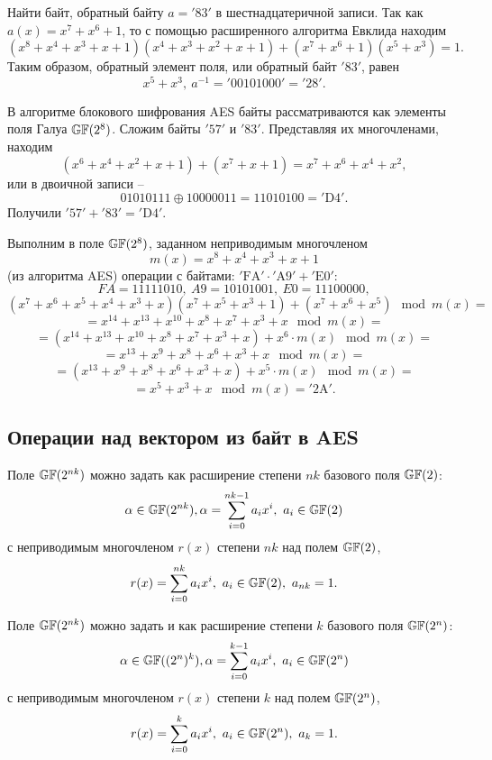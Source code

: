 \example
Найти байт, обратный байту $a = \mathrm{'83'}$ в шестнадцатеричной записи. Так как $a(x) = x^{7} + x^{6} + 1$, то с помощью расширенного алгоритма Евклида находим
    \[ (x^{8} + x^{4} + x^{3} + x + 1) (x^{4} + x^{3} + x^{2} + x + 1) + (x^{7} + x^{6} + 1) (x^{5} + x^{3}) = 1. \]
Таким образом, обратный элемент поля, или обратный байт $\mathrm{'83'}$, равен
    \[ x^{5} + x^{3}, ~ a^{-1} = \mathrm{'00101000'} = \mathrm{'28'}. \]
\exampleend

\example
В алгоритме блокового шифрования AES байты рассматриваются как элементы поля Галуа $\mathbb{GF}(2^8)$. Сложим байты $\mathrm{'57'}$ и $\mathrm{'83'}$. Представляя их многочленами, находим
    \[ (x^6 + x^4 + x^2 + x + 1) + (x^7 + x + 1) = x^7 + x^6 + x^4 + x^2, \]
или в двоичной записи --
    \[ 01010111 \oplus 10000011 = 11010100 = \mathrm{'D4'}. \]
Получили $\mathrm{'57'} + \mathrm{'83'} = \mathrm{'D4'}$.
\exampleend

\example
Выполним в поле $\mathbb{GF}(2^8)$, заданном неприводимым многочленом
    \[ m(x) = x^8 + x^4 + x^3 + x + 1 \]
(из алгоритма AES) операции с байтами: $\mathrm{'FA'} \cdot \mathrm{'A9'} + \mathrm{'E0'}$:
    \[ FA = 11111010, ~ A9 = 10101001, ~ E0 = 11100000, \]
    \[ (x^7 + x^6 + x^5 + x^4 + x^3  +x)(x^7 + x^5 + x^3 + 1) + (x^7 + x^6 + x^5) \mod m(x) = \]
    \[ = x^{14} + x^{13} + x^{10} + x^{8} + x^7 + x^3 + x \mod m(x) = \]
    \[ = (x^{14} + x^{13} + x^{10} + x^{8} + x^7 + x^3 + x) + x^6 \cdot m(x) \mod m(x) = \]
    \[ = x^{13} + x^9 + x^8 + x^6 + x^3 + x \mod m(x) = \]
    \[ = (x^{13} + x^9 + x^8 + x^6 + x^3 + x) + x^5 \cdot m(x) \mod m(x) = \]
    \[ = x^5 + x^3 + x \mod m(x) = \mathrm{'2A'}. \]
\exampleend


\subsection{Операции над вектором из байт в AES}

Поле $\mathbb{GF}(2^{nk})$ можно задать как расширение степени $nk$ базового поля $\mathbb{GF}(2)$:
    \[ \alpha \in \mathbb{GF}(2^{nk}), \alpha = \sum\limits_{i=0}^{nk-1} a_i x^i, ~ a_i \in \mathbb{GF}(2) \]
с неприводимым многочленом $r(x)$ степени $nk$ над полем $\mathbb{GF}(2)$,
    \[ r(x) = \sum\limits_{i=0}^{nk} a_i x^i, ~ a_i \in \mathbb{GF}(2), ~ a_{nk} = 1. \]

Поле $\mathbb{GF}(2^{nk})$ можно задать и как расширение степени $k$ базового поля $\mathbb{GF}(2^n)$:
    \[ \alpha \in \mathbb{GF}((2^n)^k), \alpha = \sum\limits_{i=0}^{k-1} a_i x^i, ~ a_i \in \mathbb{GF}(2^n) \]
с неприводимым многочленом $r(x)$ степени $k$ над полем $\mathbb{GF}(2^n)$,
    \[ r(x) = \sum\limits_{i=0}^{k} a_i x^i, ~ a_i \in \mathbb{GF}(2^n), ~ a_k = 1. \]

